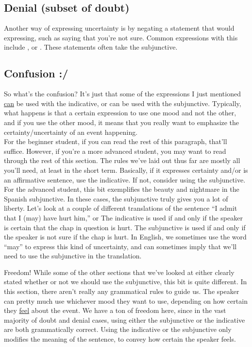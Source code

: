 \subsection{Denial (subset of doubt)}

Another way of expressing uncertainty is by negating a statement that would expressing, such as saying that you're not sure. Common expressions with this include ,  or . These statements often take the subjunctive. 

\subsection{Confusion :/}

So what's the confusion? It's just that some of the expressions I just mentioned \underline{can} be used with the indicative, or can be used with the subjunctive. Typically, what happens is that a certain expression  to use one mood and not the other, and if you use the other mood, it means that you really want to emphasize the certainty/uncertainty of an event happening. \\

For the beginner student, if you can read the rest of this paragraph, that'll suffice. However, if you're a more advanced student, you may want to read through the rest of this section. The rules we've laid out thus far are mostly all you'll need, at least in the short term. Basically, if it expresses certainty and/or is an affirmative sentence, use the indicative. If not, consider using the subjunctive. \\

For the advanced student, this bit exemplifies the beauty and nightmare in the Spanish subjunctive. In these cases, the subjunctive truly gives you a lot of liberty. Let's look at a couple of different translations of the sentence ``I admit that I (may) have hurt him,''  or  The indicative is used if and only if the speaker is certain that the chap in question is hurt. The subjunctive is used if and only if the speaker is not sure if the chap is hurt. In English, we sometimes use the word ``may'' to express this kind of uncertainty, and can sometimes imply that we'll need to use the subjunctive in the translation.

\begin{conf}{Freedom!}
	While some of the other sections that we've looked at either clearly stated whether or not we should use the subjunctive, this bit is quite different. In this section, there aren't really any grammatical rules to guide us. The speaker can pretty much use whichever mood they want to use, depending on how certain they \underline{feel} about the event. We have a ton of freedom here, since in the vast majority of doubt and denial cases, using either the subjunctive or the indicative are both grammatically correct. Using the indicative or the subjunctive only modifies the meaning of the sentence, to convey how certain the speaker feels. 
\end{conf}

